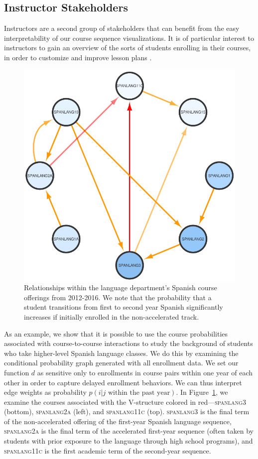 \subsection{Instructor Stakeholders}
\label{sec:instructor_stakeholders}

Instructors are a second group of stakeholders that can benefit from
the easy interpretability of our course sequence visualizations. It is
of particular interest to instructors to gain an overview of the sorts
of students enrolling in their courses, in order to customize
and improve lesson plans \cite{Leaver2002}.

\begin{figure}[h]
    \centering
    \includegraphics[width=0.4\columnwidth]{Figs/final-spanlang.pdf}  
    \caption{Relationships within the language department's Spanish course offerings from 2012-2016. We note that the probability that a student transitions from first to second year Spanish significantly increases if initially enrolled in the non-accelerated track.}
    \label{fig:spanlang}
\end{figure}

As an example, we show that it is possible to use the course probabilities associated with course-to-course interactions to study the background of students who take higher-level Spanish language classes. We do this by examining the conditional probability graph generated with
all enrollment data. We set our function $d$ as sensitive only to
enrollments in course pairs within one year of each other in order to
capture delayed enrollment behaviors. We can thus interpret edge
weights as probability $p(i|j \text{ within the past year})$. In
Figure~\ref{fig:spanlang}, we examine the courses associated with the
V-structure colored in red---\textsc{spanlang3} (bottom),
\textsc{spanlang2a} (left), and \textsc{spanlang11c}
(top). \textsc{spanlang3} is the final term of the non-accelerated
offering of the first-year Spanish language sequence,
\textsc{spanlang2a} is the final term of the accelerated first-year
sequence (often taken by students with prior exposure to the language
through high school programs), and \textsc{spanlang11c} is the first
academic term of the second-year sequence.

